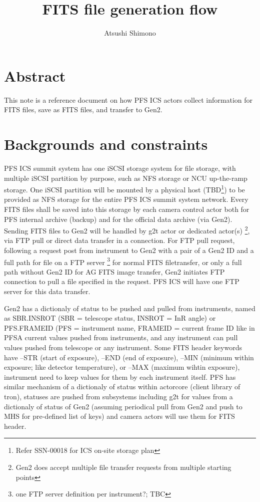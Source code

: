 \documentclass[a4paper,notitlepage]{article}
\title{FITS file generation flow}
\author{Atsushi Shimono}
\begin{document}
\drafttrue
{}
\SSNChangeRecord{
}

\ssnhead

\section{Abstract}

This note is a reference document on how PFS ICS actors collect information for 
FITS files, save as FITS files, and transfer to Gen2.


\section{Backgrounds and constraints}

PFS ICS summit system has one iSCSI storage system for file storage, with multiple
iSCSI partition by purpose, such as NFS storage or NCU up-the-ramp storage. One iSCSI
partition will be mounted by a physical host (TBD\footnote{Refer SSN-00018 for ICS 
on-site storage plan}) to be provided as NFS storage for
the entire PFS ICS summit system network. Every FITS files shall be saved into this
storage by each camera control actor both for PFS internal archive (backup) and for
the official data archive (via Gen2). Sending FITS files to Gen2 will be handled by
g2t actor or dedicated actor(s) \footnote{Gen2 does accept multiple file transfer requests
from multiple starting points}, via FTP pull or direct data transfer in a connection.
For FTP pull request, following a request post from instrument to Gen2 with a pair
of a Gen2 ID and a full path for file on a FTP server \footnote{one FTP server definition per
instrument?; TBC} for normal FITS filetransfer, or only a full path without Gen2 ID
for AG FITS image transfer, Gen2 initiates FTP connection to pull a file specified
in the request. PFS ICS will have one FTP server for this data transfer.

Gen2 has a dictionaly of status to be pushed and pulled from instruments, named
as SBR.INSROT (SBR = telescope status, INSROT = InR angle) or PFS.FRAMEID (PFS =
instrument name, FRAMEID = current frame ID like in PFSA%
current values pushed from instruments, and any instrument can pull values pushed
from telescope or any instrument. Some FITS header keywords have --STR (start of
exposure), --END (end of exposure), --MIN (minimum within exposure; like detector
temperature), or --MAX (maximum wihtin exposure), instrument need to keep values
for them by each instrument itself. PFS has similar mechanism of a dictionaly of
status within actorcore (client library of tron), statuses are pushed from
subsystems including g2t for values from a dictionaly of status of Gen2 (assuming
periodical pull from Gen2 and push to MHS for pre-defined list of keys) and camera
actors will use them for FITS header.
\end{document}
